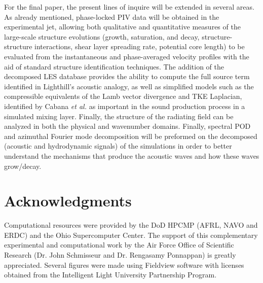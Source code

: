 \documentclass[english]{aiaa-tc}
\begin{document}
For the final paper, the present lines of inquire will be extended in several areas. As already mentioned, phase-locked PIV data will be obtained in the experimental jet, allowing both qualitative and quantitative measures of the large-scale structure evolutions (growth, saturation, and decay, structure-structure interactions, shear layer spreading rate, potential core length) to be evaluated from the instantaneous and phase-averaged velocity profiles with the aid of standard structure identification techniques. The addition of the decomposed LES database provides the ability to compute the full source term identified in Lighthill's acoustic analogy, as well as simplified models such as the compressible equivalents of the Lamb vector divergence and TKE Laplacian, identified by Cabana {\em et al.}\cite{Cabana2008} as important in the sound production process in a simulated mixing layer. Finally, the structure of the radiating field can be analyzed in both the physical and wavenumber domains. Finally, spectral POD and azimuthal Fourier mode decomposition will be preformed on the decomposed (acoustic and hydrodynamic signals) of the simulations in order to better understand the mechanisms that produce the acoustic waves and how these waves grow/decay. 


\section*{Acknowledgments}
   Computational resources were provided by the DoD HPCMP (AFRL, NAVO and ERDC) and the Ohio Supercomputer Center. The support of this complementary experimental and computational work by the Air Force Office of Scientific Research (Dr. John Schmisseur and Dr. Rengasamy Ponnappan) is greatly appreciated. Several figures were made using Fieldview software with licenses obtained from the Intelligent Light University Partnership Program.



\end{document}
